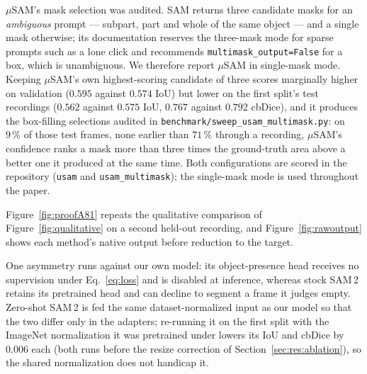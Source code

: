 \documentclass[11pt,a4paper]{article}
\begin{document}
$\mu$SAM's mask selection was audited. SAM returns three candidate masks for
an \emph{ambiguous} prompt --- subpart, part and whole of the same object ---
and a single mask otherwise; its documentation reserves the three-mask mode
for sparse prompts such as a lone click and recommends
\texttt{multimask\_output=False} for a box, which is unambiguous. We
therefore report $\mu$SAM in single-mask mode. Keeping $\mu$SAM's own
highest-scoring candidate of three scores marginally higher on validation
($0.595$ against $0.574$ IoU) but lower on the first split's test recordings
($0.562$ against $0.575$ IoU, $0.767$ against $0.792$ cbDice), and it produces the
box-filling selections audited in
\texttt{benchmark/sweep\_usam\_multimask.py}: on $9\,\%$ of those test frames,
none earlier than $71\,\%$ through a recording, $\mu$SAM's confidence ranks
a mask more than three times the ground-truth area above a better one it
produced at the same time. Both configurations are scored in the repository
(\texttt{usam} and \texttt{usam\_multimask}); the single-mask mode is used
throughout the paper.

Figure~\ref{fig:proofA81} repeats the qualitative comparison of
Figure~\ref{fig:qualitative} on a second held-out recording, and
Figure~\ref{fig:rawoutput} shows each method's native output before
reduction to the target.

One asymmetry runs against our own model: its object-presence head receives
no supervision under Eq.~\ref{eq:loss} and is disabled at inference, whereas
stock SAM\,2 retains its pretrained head and can decline to segment a frame
it judges empty. Zero-shot SAM\,2 is fed the same dataset-normalized input as
our model so that the two differ only in the adapters; re-running it on the
first split with the ImageNet normalization it was pretrained under lowers its
IoU and cbDice by $0.006$ each (both runs before the resize correction of
Section~\ref{sec:res:ablation}), so the shared normalization does not handicap it.
\end{document}
